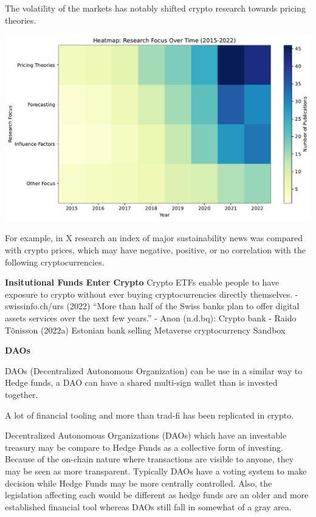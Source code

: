 \documentclass[
  letterpaper,
  DIV=11,
  numbers=noendperiod]{scrartcl}
\begin{document}
The volatility of the markets has notably shifted crypto research
towards pricing theories.

\includegraphics{_thesis_files/figure-pdf/cell-41-output-1.pdf}

For example, in X research an index of major sustainability news was
compared with crypto prices, which may have negative, positive, or no
correlation with the following cryptocurrencies.

\textbf{Insitutional Funds Enter Crypto} Crypto ETFs enable people to
have exposure to crypto without ever buying cryptocurrencies directly
themselves. - swissinfo.ch/urs (2022) ``More than half of the Swiss
banks plan to offer digital assets services over the next few years.'' -
Anon (n.d.bq): Crypto bank - Raido Tõnisson (2022a) Estonian bank
selling Metaverse cryptocurrency Sandbox

\textbf{DAOs}

DAOs (Decentralized Autonomous Organization) can be use in a similar way
to Hedge funds, a DAO can have a shared multi-sign wallet than is
invested together.

A lot of financial tooling and more than trad-fi has been replicated in
crypto.

Decentralized Autonomous Organizations (DAOs) which have an investable
treasury may be compare to Hedge Funds as a collective form of
investing. Because of the on-chain nature where transactions are visible
to anyone, they may be seen as more transparent. Typically DAOs have a
voting system to make decision while Hedge Funds may be more centrally
controlled. Also, the legislation affecting each would be different as
hedge funds are an older and more established financial tool whereas
DAOs still fall in somewhat of a gray area.
\end{document}
